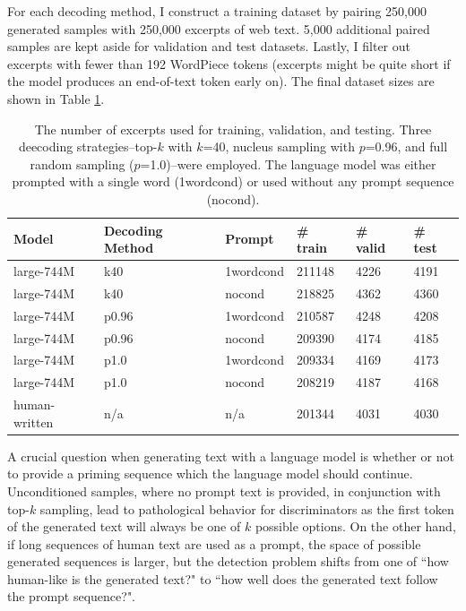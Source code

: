 For each decoding method, I construct a training dataset by pairing 250,000 generated samples with 250,000 excerpts of web text.
5,000 additional paired samples are kept aside for validation and test datasets.
Lastly, I filter out excerpts with fewer than 192 WordPiece tokens \citep{wu2016google} (excerpts might be quite short if the model produces an end-of-text token early on).
The final dataset sizes are shown in Table \ref{tab:dataset_sizes}.

\begin{table}[t]
    \small
    \caption{The number of excerpts used for training, validation, and testing. Three deecoding strategies--top-$k$ with $k$=40, nucleus sampling with $p$=0.96, and full random sampling ($p$=1.0)--were employed. The language model was either prompted with a single word (1wordcond) or used without any prompt sequence (nocond).}
    \centering
    \begin{tabular}{l|l|l|l|l|l}
    \hline
    \textbf{Model} & \textbf{Decoding Method} & \textbf{Prompt} & \textbf{\# train} & \textbf{\# valid} & \textbf{\# test} \\ \hline \hline
    large-744M & k40 & 1wordcond & 211148 & 4226 & 4191 \\
    large-744M & k40 & nocond & 218825 & 4362 & 4360 \\
    large-744M & p0.96 & 1wordcond & 210587 & 4248 & 4208 \\ 
    large-744M & p0.96 & nocond & 209390 & 4174 & 4185 \\ 
    large-744M & p1.0 & 1wordcond & 209334 & 4169 & 4173 \\ 
    large-744M & p1.0 & nocond & 208219 & 4187 & 4168 \\ \Xhline{\arrayrulewidth}
    human-written & n/a & n/a & 201344 & 4031 & 4030 \\ \hline
    \end{tabular}
    \label{tab:dataset_sizes}
\end{table}

A crucial question when generating text with a language model is whether or not to provide a priming sequence which the language model should continue.
Unconditioned samples, where no prompt text is provided, in conjunction with top-$k$ sampling, lead to pathological behavior for discriminators as the first token of the generated text will always be one of $k$ possible options.
On the other hand, if long sequences of human text are used as a prompt, the space of possible generated sequences is larger, but the detection problem shifts from one of ``how human-like is the generated text?" to ``how well does the generated text follow the prompt sequence?".

